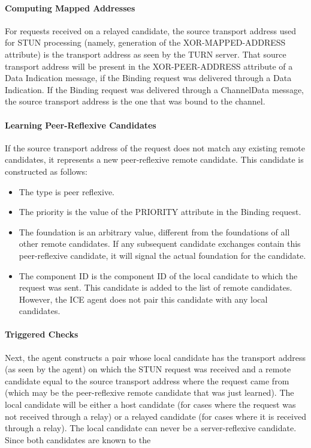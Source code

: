 \documentclass{article}
\begin{document}
\paragraph{Computing Mapped Addresses}

For requests received on a relayed candidate, the source transport address used for STUN processing (namely, generation of the XOR-MAPPED-ADDRESS attribute) is the transport address as seen by the TURN server.  That source transport address will be present in the XOR-PEER-ADDRESS attribute of a Data Indication message, if the Binding request was delivered through a Data Indication.  If the Binding request was delivered through a ChannelData message, the source transport address is the one that was bound to the channel.

\paragraph{Learning Peer-Reflexive Candidates}

If the source transport address of the request does not match any existing remote candidates, it represents a new peer-reflexive remote candidate.  This candidate is constructed as follows:

\begin{itemize}
\item The type is peer reflexive.
\item The priority is the value of the PRIORITY attribute in the Binding request.
\item The foundation is an arbitrary value, different from the foundations of all other remote candidates.  If any subsequent candidate exchanges contain this peer-reflexive candidate, it will signal the actual foundation for the candidate.
\item The component ID is the component ID of the local candidate to which the request was sent.
This candidate is added to the list of remote candidates.  However, the ICE agent does not pair this candidate with any local candidates.

\end{itemize}
\paragraph{Triggered Checks}

Next, the agent constructs a pair whose local candidate has the transport address (as seen by the agent) on which the STUN request was received and a remote candidate equal to the source transport address where the request came from (which may be the peer-reflexive remote candidate that was just learned).  The local candidate will be either a host candidate (for cases where the request was not received through a relay) or a relayed candidate (for cases where it is received through a relay).  The local candidate can never be a server-reflexive candidate.  Since both candidates are known to the
\end{document}
